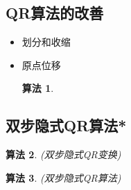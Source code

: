 \documentclass[twoside]{article}
\newtheorem{algo}{算法}[section]
\begin{document}
\subsection{QR算法的改善}
\begin{itemize}
  \item 划分和收缩
  \item 原点位移
    \begin{algo}
    \end{algo}
\end{itemize}

\subsection{双步隐式QR算法*}
\begin{algo}
  (双步隐式QR变换)
\end{algo}
\begin{algo}
  (双步隐式QR算法)
\end{algo}
\end{document}
